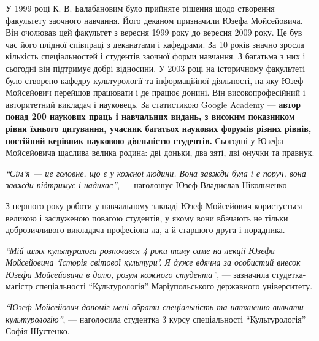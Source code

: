 У 1999 році К. В. Балабановим було прийняте рішення щодо створення факультету
заочного навчання. Його деканом призначили Юзефа Мойсейовича. Він очолював цей
факультет з вересня 1999 року до вересня 2009 року. Це був час його плідної
співпраці з деканатами і кафедрами. За 10 років значно зросла кількість
спеціальностей і студентів заочної форми навчання. З багатьма з них і сьогодні
він підтримує добрі відносини. У 2003 році на історичному факультеті було
створено кафедру культурології та інформаційної діяльності, на яку Юзеф
Мойсейович перейшов працювати і де працює донині. Він високопрофесійний і
авторитетний викладач і науковець. За статистикою Google Academy — \textbf{автор понад
200 наукових праць і навчальних видань, з високим показником рівня їхнього
цитування, учасник багатьох наукових форумів різних рівнів, постійний керівник
науковою діяльністю студентів.} Сьогодні у Юзефа Мойсейовича щаслива велика
родина: дві доньки, два зяті, дві онучки та правнук.

\begin{leftbar}
\emph{\enquote{Сім'я — це головне, що є у кожної людини. Вона завжди була і є поруч, вона
завжди підтримує і надихає}}, — наголошує Юзеф-Владислав Нікольченко 
\end{leftbar}



З першого року роботи у навчальному закладі Юзеф Мойсейович користується
великою і заслуженою повагою студентів, у якому вони вбачають не тільки
доброзичливого викладача-професіона\hyp{}ла, а й старшого друга і порадника.

\begin{leftbar}
\emph{\enquote{Мій шлях культуролога розпочався 4 роки тому саме на лекції Юзефа
Мойсейовича \enquote{Історія світової культури}. Я дуже вдячна за особистий внесок
Юзефа Мойсейовича в долю, розум кожного студента}}, — зазначила студетка-магістр
спеціальності \enquote{Культурологія} Маріупольського державного університету.
\end{leftbar}

\begin{leftbar}
\emph{\enquote{Юзеф Мойсейович допоміг мені обрати спеціальність та натхненно вивчати
культурологію}}, — наголосила студентка 3 курсу спеціальності \enquote{Культурологія}
Софія Шустенко.
\end{leftbar}

